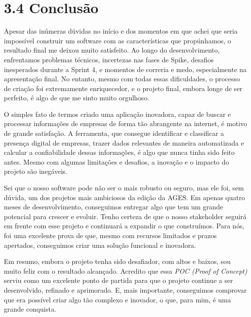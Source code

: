 \section*{3.4 Conclusão}
\label{ages-ii:text-h-0073}
\indent Apesar das inúmeras dúvidas no início e dos momentos em que achei que seria impossível construir um software com as características que propúnhamos, o resultado final me deixou muito satisfeito. Ao longo do desenvolvimento, enfrentamos problemas técnicos, incertezas nas fases de Spike, desafios inesperados durante a Sprint 4, e momentos de correria e medo, especialmente na apresentação final. No entanto, mesmo com todas essas dificuldades, o processo de criação foi extremamente enriquecedor, e o projeto final, embora longe de ser perfeito, é algo de que me sinto muito orgulhoso.\par
\indent O simples fato de termos criado uma aplicação inovadora, capaz de buscar e processar informações de empresas de forma tão abrangente na internet, é motivo de grande satisfação. A ferramenta, que consegue identificar e classificar a presença digital de empresas, trazer dados relevantes de maneira automatizada e calcular a confiabilidade dessas informações, é algo que nunca tinha sido feito antes. Mesmo com algumas limitações e desafios, a inovação e o impacto do projeto são inegáveis.\par
\indent Sei que o nosso software pode não ser o mais robusto ou seguro, mas ele foi, sem dúvida, um dos projetos mais ambiciosos da edição da AGES. Em apenas quatro meses de desenvolvimento, conseguimos entregar algo que tem um grande potencial para crescer e evoluir. Tenho certeza de que o nosso stakeholder seguirá em frente com esse projeto e continuará a expandir o que construímos. Para nós, foi uma excelente prova de que, mesmo com recursos limitados e prazos apertados, conseguimos criar uma solução funcional e inovadora.\par
\indent Em resumo, embora o projeto tenha sido desafiador, com altos e baixos, sou muito feliz com o resultado alcançado. Acredito que essa \textit{POC (Proof of Concept)} serviu como um excelente ponto de partida para que o projeto continue a ser desenvolvido, refinado e aprimorado. E, mais importante, conseguimos comprovar que era possível criar algo tão complexo e inovador, o que, para mim, é uma grande conquista.\par
